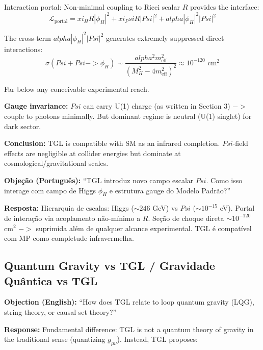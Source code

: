 \documentclass[12pt,a4paper]{article}
\def\Psi{Psi}%
\def\to{ -> }%
\def\alpha{alpha}%
\def\xi{xi}%
\begin{document}
Interaction portal: Non-minimal coupling to Ricci scalar $R$ provides the interface:
\begin{equation}
\mathcal{L}_{\text{portal}} = \xi_H R|\phi_H|^2 + \xi_\Psi R|\Psi|^2 + \alpha|\phi_H|^2|\Psi|^2
\end{equation}

The cross-term $\alpha|\phi_H|^2|\Psi|^2$ generates extremely suppressed direct interactions:
\begin{equation}
\sigma(\Psi + \Psi \to \phi_H) \sim \frac{\alpha^2 m_{\text{eff}}^2}{(M_H^2 - 4m_{\text{eff}}^2)^2} \approx 10^{-120}\text{ cm}^2
\end{equation}

Far below any conceivable experimental reach.

\textbf{Gauge invariance:} $\Psi$ can carry U(1) charge (as written in Section 3) $\to$ couple to photons minimally. But dominant regime is neutral (U(1) singlet) for dark sector.

\textbf{Conclusion:} TGL is compatible with SM as an infrared completion. $\Psi$-field effects are negligible at collider energies but dominate at cosmological/gravitational scales.

\textbf{Objeção (Português):} ``TGL introduz novo campo escalar $\Psi$. Como isso interage com campo de Higgs $\phi_H$ e estrutura gauge do Modelo Padrão?''

\textbf{Resposta:} Hierarquia de escalas: Higgs ($\sim 246$ GeV) vs $\Psi$ ($\sim 10^{-15}$ eV). Portal de interação via acoplamento não-mínimo a $R$. Seção de choque direta $\sim 10^{-120}$ cm$^2$ $\to$ suprimida além de qualquer alcance experimental. TGL é compatível com MP como completude infravermelha.


\subsection{Quantum Gravity vs TGL / Gravidade Quântica vs TGL}

\textbf{Objection (English):} ``How does TGL relate to loop quantum gravity (LQG), string theory, or causal set theory?''

\textbf{Response:} Fundamental difference: TGL is not a quantum theory of gravity in the traditional sense (quantizing $g_{\mu\nu}$). Instead, TGL proposes:

\begin{center}
\end{center}
\end{document}
